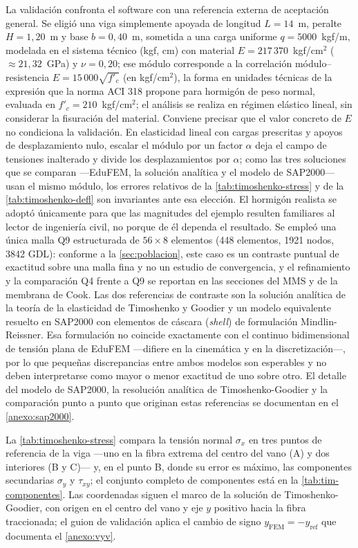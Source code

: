 La validación confronta el software con una referencia externa de aceptación general. Se eligió una viga simplemente apoyada de longitud $L = 14$~m, peralte $H = 1{,}20$~m y base $b = 0{,}40$~m, sometida a una carga uniforme $q = 5000$~kgf/m, modelada en el sistema técnico (kgf, cm) con material $E = 217\,370$~kgf/cm$^2$ ($\approx 21{,}32$~GPa) y $\nu = 0{,}20$; ese módulo corresponde a la correlación módulo--resistencia $E = 15\,000\sqrt{f'_c}$ (en kgf/cm$^2$), la forma en unidades técnicas de la expresión que la norma ACI 318 propone para hormigón de peso normal, evaluada en $f'_c = 210$~kgf/cm$^2$; el análisis se realiza en régimen elástico lineal, sin considerar la fisuración del material. Conviene precisar que el valor concreto de $E$ no condiciona la validación. En elasticidad lineal con cargas prescritas y apoyos de desplazamiento nulo, escalar el módulo por un factor $\alpha$ deja el campo de tensiones inalterado y divide los desplazamientos por $\alpha$; como las tres soluciones que se comparan ---EduFEM, la solución analítica y el modelo de SAP2000--- usan el mismo módulo, los errores relativos de la \autoref{tab:timoshenko-stress} y de la \autoref{tab:timoshenko-defl} son invariantes ante esa elección. El hormigón realista se adoptó únicamente para que las magnitudes del ejemplo resulten familiares al lector de ingeniería civil, no porque de él dependa el resultado. Se empleó una única malla Q9 estructurada de $56\times8$ elementos (448 elementos, 1921 nodos, 3842 GDL): conforme a la \autoref{sec:poblacion}, este caso es un contraste puntual de exactitud sobre una malla fina y no un estudio de convergencia, y el refinamiento y la comparación Q4 frente a Q9 se reportan en las secciones del MMS y de la membrana de Cook. Las dos referencias de contraste son la solución analítica de la teoría de la elasticidad de Timoshenko y Goodier \autocite[art.~21, pp.~39-43]{timoshenko1970elasticity} y un modelo equivalente resuelto en SAP2000 \autocite[p.~179]{csi2017sap2000} con elementos de cáscara (\emph{shell}) de formulación Mindlin-Reissner. Esa formulación no coincide exactamente con el continuo bidimensional de tensión plana de EduFEM —difiere en la cinemática y en la discretización—, por lo que pequeñas discrepancias entre ambos modelos son esperables y no deben interpretarse como mayor o menor exactitud de uno sobre otro. El detalle del modelo de SAP2000, la resolución analítica de Timoshenko-Goodier y la comparación punto a punto que originan estas referencias se documentan en el \autoref{anexo:sap2000}.

La \autoref{tab:timoshenko-stress} compara la tensión normal $\sigma_x$ en tres puntos de referencia de la viga —uno en la fibra extrema del centro del vano (A) y dos interiores (B y C)— y, en el punto B, donde su error es máximo, las componentes secundarias $\sigma_y$ y $\tau_{xy}$; el conjunto completo de componentes está en la \autoref{tab:tim-componentes}. Las coordenadas siguen el marco de la solución de Timoshenko-Goodier, con origen en el centro del vano y eje $y$ positivo hacia la fibra traccionada; el guion de validación aplica el cambio de signo $y_{\text{FEM}} = -y_{\text{ref}}$ que documenta el \autoref{anexo:vyv}.


